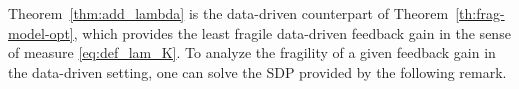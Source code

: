 \documentclass[9pt,shortpaper,twoside,web]{ieeecolor}
\newcommand{\mac}[1]{\mathcal{#1}}
\begin{document}

Theorem~\ref{thm:add_lambda} is the data-driven counterpart of Theorem~\ref{th:frag-model-opt}, which provides the least fragile data-driven feedback gain in the sense of measure \eqref{eq:def_lam_K}. To analyze the fragility of a given feedback gain in the data-driven setting, one can solve the SDP provided by the following remark. 
\end{document}
